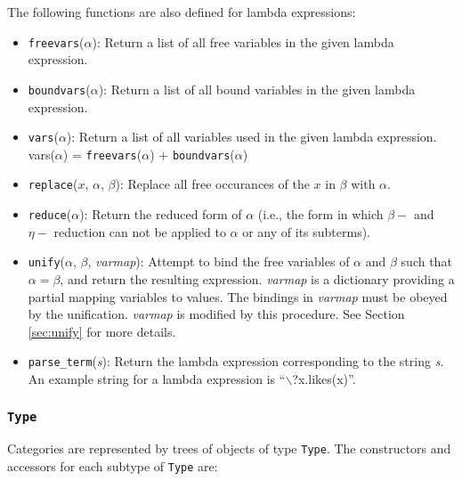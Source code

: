 \documentclass[11pt]{article}
\begin{document}
\vspace{3mm}\noindent
The following functions are also defined for lambda expressions:
\begin{itemize}

  \item \texttt{freevars}($\alpha$): Return a list of all free variables
  in the given lambda expression.

  \item \texttt{boundvars}($\alpha$): Return a list of all bound variables
  in the given lambda expression.

  \item \texttt{vars}($\alpha$): Return a list of all variables used in
  the given lambda expression.  vars($\alpha$) = \texttt{freevars}($\alpha$) +
  \texttt{boundvars}($\alpha$)

  \item \texttt{replace}($x$, $\alpha$, $\beta$): Replace all free occurances
  of the $x$ in $\beta$ with $\alpha$.

  \item \texttt{reduce}($\alpha$): Return the reduced form of $\alpha$
  (i.e., the form in which $\beta-$ and $\eta-$ reduction can not be
  applied to $\alpha$ or any of its subterms).

  \item \texttt{unify}($\alpha$, $\beta$, \textit{varmap}): Attempt to bind
  the free variables of $\alpha$ and $\beta$ such that $\alpha=\beta$, and return
  the resulting expression.  \textit{varmap} is a dictionary providing
  a partial mapping variables to values.  The bindings in
  \textit{varmap} must be obeyed by the unification.  \textit{varmap}
  is modified by this procedure.  See Section \ref{sec:unify} for more
  details.

  \item \texttt{parse\_term}(\textit{s}): Return the lambda expression
  corresponding to the string \textit{s}.  An example string for a
  lambda expression is ``$\backslash$?x.likes(x)''.
\end{itemize}

\subsubsection{\texttt{Type}}

Categories are represented by trees of objects of type
\texttt{Type}.  The constructors and accessors for each subtype of
\texttt{Type} are:
\end{document}
